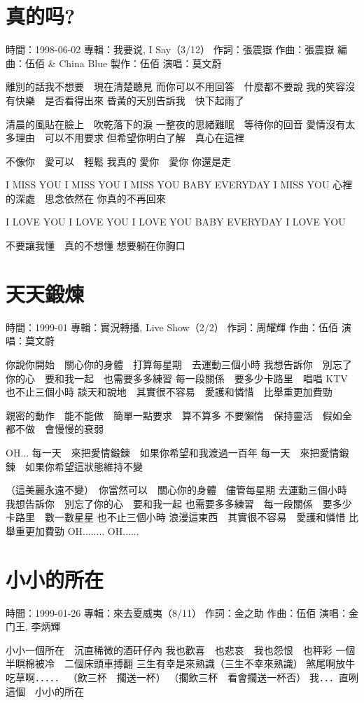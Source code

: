 \documentclass[UTF8,a4paper,oneside,twocolumn,12pt]{ctexbook}
\newcommand{\infopair}[2]{\textbullet #1：#2}
\newcommand{\zc}[1][伍佰]{\infopair{作詞}{#1}}
\newcommand{\zq}[1][伍佰]{\infopair{作曲}{#1}}
\newcommand{\bq}[1][伍佰]{\infopair{編曲}{#1}}
\newcommand{\zj}[1]{\infopair{專輯}{#1}}
\newcommand{\zz}[1]{\infopair{製作}{#1}}
\newcommand{\sj}[1]{\infopair{時間}{#1}}
\newenvironment{info}{\begin{flushleft}\kaishu
	}
	{\end{flushleft}\normalsize\yahei\par}
\newenvironment{lyric}{
	}
{}
\begin{document}
\section{真的吗?}
\begin{info}
	\sj{1998-06-02}
	\zj{我要说, I Say（3/12）}
	\zc[張震嶽]
	\zq[張震嶽]
	\bq[伍佰 \& China Blue]
	\zz{伍佰}
	\infopair{演唱}{莫文蔚}
\end{info}
\begin{lyric}
	離別的話我不想要　現在清楚聽見
	而你可以不用回答　什麼都不要說
	我的笑容沒有快樂　是否看得出來
	昏黃的天別告訴我　快下起雨了

	清晨的風貼在臉上　吹乾落下的淚
	一整夜的思緒難眠　等待你的回音
	愛情沒有太多理由　可以不用要求
	但希望你明白了解　真心在這裡

	不像你　愛可以　輕鬆  我真的
	愛你　愛你  你還是走

	I MISS YOU  I MISS YOU  I MISS YOU
	BABY EVERYDAY I MISS YOU
	心裡的深處　思念依然在  你真的不再回來

	I LOVE YOU  I LOVE YOU  I LOVE YOU
	BABY EVERYDAY I LOVE YOU

	不要讓我懂　真的不想懂  想要躺在你胸口
\end{lyric}

\section{天天鍛煉}
\begin{info}
	\sj{1999-01}
	\zj{實況轉播, Live Show（2/2）}
	\zc[周耀輝]
	\zq
	\infopair{演唱}{莫文蔚}
\end{info}
\begin{lyric}
	你說你開始　關心你的身體　打算每星期　去運動三個小時
	我想告訴你　別忘了你的心　要和我一起　也需要多多練習
	每一段關係　要多少卡路里　唱唱 KTV  也不止三個小時
	談天和說地　其實很不容易　愛護和憐惜　比舉重更加費勁

	親密的動作　能不能做　簡單一點要求　算不算多
	不要懶惰　保持靈活　假如全都不做　會慢慢的衰弱

	OH... 每一天　來把愛情鍛鍊　如果你希望和我渡過一百年
	每一天　來把愛情鍛鍊　如果你希望這狀態維持不變

	（這美麗永遠不變）　你當然可以　關心你的身體　儘管每星期
	去運動三個小時　我想告訴你　別忘了你的心　要和我一起
	也需要多多練習　每一段關係　要多少卡路里　數一數星星
	也不止三個小時  浪漫這東西　其實很不容易　愛護和憐惜
	比舉重更加費勁  OH........  OH......
\end{lyric}

\section{小小的所在}
\begin{info}
	\sj{1999-01-26}
	\zj{來去夏威夷（8/11）}
	\zc[金之助]
	\zq[伍佰]
	\infopair{演唱}{金门王, 李炳輝}
\end{info}
\begin{lyric}
	小小一個所在　沉直稀微的酒矸仔內
	我也歡喜　也悲哀　我也怨恨　也秤彩
	一個半瞑棉被冷　二個床頭車搏翻
	三生有幸是來熟識（三生不幸來熟識）
	煞尾啊放牛吃草啊．．．．．
	（飲三杯　擱送一杯）
	（擱飲三杯　看會擱送一杯否）
	我．．．直咧這個　小小的所在
\end{lyric}
\end{document}
